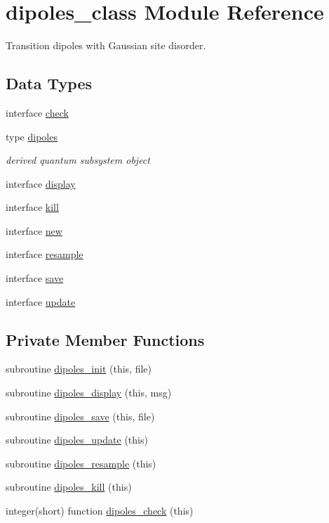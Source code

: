 \hypertarget{classdipoles__class}{\section{dipoles\-\_\-class Module Reference}
\label{classdipoles__class}
}


Transition dipoles with Gaussian site disorder.  


\subsection*{Data Types}
\begin{DoxyCompactItemize}
\item 
interface \hyperlink{interfacedipoles__class_1_1check}{check}
\item 
type \hyperlink{structdipoles__class_1_1dipoles}{dipoles}
\begin{DoxyCompactList}\small\item\em derived quantum subsystem object \end{DoxyCompactList}\item 
interface \hyperlink{interfacedipoles__class_1_1display}{display}
\item 
interface \hyperlink{interfacedipoles__class_1_1kill}{kill}
\item 
interface \hyperlink{interfacedipoles__class_1_1new}{new}
\item 
interface \hyperlink{interfacedipoles__class_1_1resample}{resample}
\item 
interface \hyperlink{interfacedipoles__class_1_1save}{save}
\item 
interface \hyperlink{interfacedipoles__class_1_1update}{update}
\end{DoxyCompactItemize}
\subsection*{Private Member Functions}
\begin{DoxyCompactItemize}
\item 
subroutine \hyperlink{classdipoles__class_a947aef5d45c6e39accc6c0e20f619c57}{dipoles\-\_\-init} (this, file)
\item 
subroutine \hyperlink{classdipoles__class_a732ca8b1573dd77731c6272ce551bc70}{dipoles\-\_\-display} (this, msg)
\item 
subroutine \hyperlink{classdipoles__class_a9ab428011961577796577f9cdeb032b4}{dipoles\-\_\-save} (this, file)
\item 
subroutine \hyperlink{classdipoles__class_a9157bf14add87f3f26edfbc88c0da6fe}{dipoles\-\_\-update} (this)
\item 
subroutine \hyperlink{classdipoles__class_a2d80cb493920a4619e0e83abfcb033f6}{dipoles\-\_\-resample} (this)
\item 
subroutine \hyperlink{classdipoles__class_ab610221599ac72fa22a02617e550033b}{dipoles\-\_\-kill} (this)
\item 
integer(short) function \hyperlink{classdipoles__class_acf34b0d8a2cae92c5b35a03eb9c0237b}{dipoles\-\_\-check} (this)
\end{DoxyCompactItemize}


